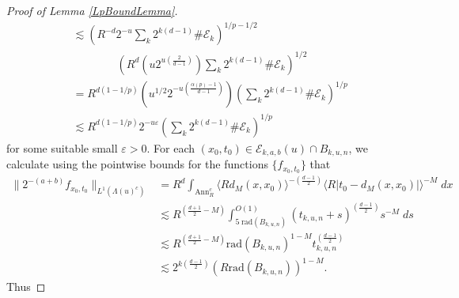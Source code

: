 \begin{proof}[Proof of Lemma \ref{LpBoundLemma}]
\begin{equation}
\begin{split}
    &\lesssim \left( R^{-d} 2^{-u} \sum\nolimits_k 2^{k(d-1)} \# \mathcal{E}_k \right)^{1/p - 1/2}\\
    &\quad\quad\quad\quad \left( R^{d} \left( u 2^{u \left( \frac{2}{d-1} \right)} \right) \sum\nolimits_k 2^{k(d-1)} \# \mathcal{E}_k \right)^{1/2}\\
    &= R^{d(1-1/p)} \left( u^{1/2} 2^{-u \left( \frac{\alpha(p) - 1}{d - 1} \right)}  \right) \left( \sum\nolimits_k 2^{k(d-1)} \# \mathcal{E}_k \right)^{1/p}\\
    &\lesssim R^{d(1 - 1/p)} 2^{-u \varepsilon} \left( \sum\nolimits_k 2^{k(d-1)} \# \mathcal{E}_k \right)^{1/p}
\end{split}
\end{equation}
%
for some suitable small $\varepsilon > 0$. For each $(x_0,t_0) \in \mathcal{E}_{k,a,b}(u) \cap B_{k,u,n}$, we calculate using the pointwise bounds for the functions $\{ f_{x_0,t_0} \}$ that
%
\begin{equation}
\begin{split}
        \| 2^{-(a+b)} f_{x_0,t_0} \|_{L^1(\Lambda(u)^c)} &= R^{d} \int_{\text{Ann}_R^c} \langle R d_M(x,x_0) \rangle^{- \left( \frac{d-1}{2} \right)} \langle R |t_0 - d_M(x,x_0)| \rangle^{-M}\; dx\\
        &\lesssim R^{ \left( \frac{d+1}{2} - M \right)} \int_{5\; \text{rad}(B_{k,u,n})}^{O(1)} ( t_{k,u,n} + s)^{\left( \frac{d-1}{2} \right)} s^{-M}\; ds\\
        &\lesssim R^{ \left( \frac{d+1}{2} - M \right)} \text{rad}(B_{k,u,n})^{1-M} t_{k,u,n}^{\left( \frac{d-1}{2} \right)}\\
        &\lesssim 2^{k \left( \frac{d-1}{2} \right)} (R \text{rad}(B_{k,u,n}))^{1 - M}.
\end{split}
\end{equation}
%
Thus
%

\end{proof}
